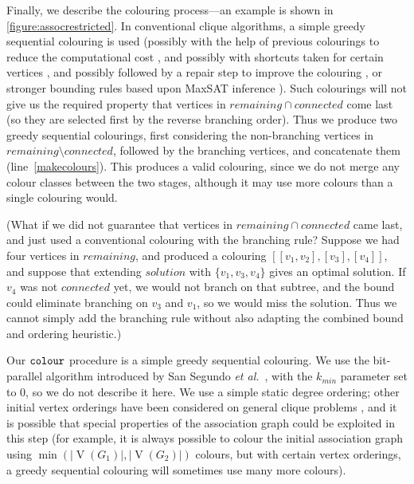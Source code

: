 \documentclass{llncs}
\newcommand{\lineref}[1]{line~\ref{#1}}
\begin{document}
Finally, we describe the colouring process---an example is shown in \cref{figure:assocrestricted}.
In conventional clique algorithms, a simple greedy sequential colouring is used (possibly with the
help of previous colourings to reduce the computational cost \cite{DBLP:conf/lion/NikolaevBS15}, and
possibly with shortcuts taken for certain vertices \cite{DBLP:journals/cor/SegundoT14}, and possibly
followed by a repair step to improve the colouring \cite{DBLP:conf/walcom/TomitaSHTW10}, or stronger
bounding rules based upon MaxSAT inference
\cite{DBLP:conf/ictai/LiFX13,DBLP:conf/lion/LiJX15,DBLP:journals/cor/SegundoNB15}).  Such colourings
will not give us the required property that vertices in $\mathit{remaining} \cap \mathit{connected}$
come last (so they are selected first by the reverse branching order). Thus we produce two greedy
sequential colourings, first considering the non-branching vertices in $\mathit{remaining} \setminus
\mathit{connected}$, followed by the branching vertices, and concatenate them
(\lineref{makecolours}). This produces a valid colouring, since we do not merge any colour classes
between the two stages, although it may use more colours than a single colouring would.

(What if we did not guarantee that vertices in $\mathit{remaining} \cap \mathit{connected}$ came
last, and just used a conventional colouring with the branching rule?  Suppose we had four vertices
in $\mathit{remaining}$, and produced a colouring $[[v_1, v_2], [v_3], [v_4]]$, and suppose that
extending $\mathit{solution}$ with $\{ v_1, v_3, v_4 \}$ gives an optimal solution. If $v_4$ was not
$\mathit{connected}$ yet, we would not branch on that subtree, and the bound could eliminate
branching on $v_3$ and $v_1$, so we would miss the solution. Thus we cannot simply add the branching
rule without also adapting the combined bound and ordering heuristic.)

Our $\FuncSty{colour}$ procedure is a simple greedy sequential colouring. We use the bit-parallel
algorithm introduced by San Segundo \textit{et al.}\ \cite{DBLP:journals/cor/SegundoRJ11}, with the
$k_{\mathit{min}}$ parameter set to $0$, so we do not describe it here. We use a simple static degree
ordering; other initial vertex orderings have been considered on general clique problems
\cite{DBLP:journals/algorithms/Prosser12,DBLP:conf/lion/SegundoLB14}, and it is possible that
special properties of the association graph could be exploited in this step (for example, it is
always possible to colour the initial association graph using
$\operatorname{min}(\left|\operatorname{V}(G_1)\right|, \left|\operatorname{V}(G_2)\right|)$
colours, but with certain vertex orderings, a greedy sequential colouring will sometimes use
many more colours).
\end{document}

